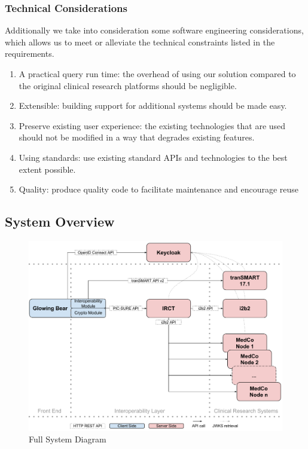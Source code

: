 \begin{samepage}
\subsubsection*{Technical Considerations}

Additionally we take into consideration some software engineering considerations, which allows us to meet or alleviate the technical constraints listed in the requirements.
\begin{enumerate}
    \item A practical query run time: the overhead of using our solution compared to the original clinical research platforms should be negligible.
    \item Extensible: building support for additional systems should be made easy.
    \item Preserve existing user experience: the existing technologies that are used should not be modified in a way that degrades existing features.
    \item Using standards: use existing standard APIs and technologies to the best extent possible.
    \item Quality: produce quality code to facilitate maintenance and encourage reuse
\end{enumerate}
\end{samepage}


\subsection{System Overview}
\begin{figure}[ht]
    \centering
    \includegraphics[width=1\textwidth]{figures/sys_diagram_full.pdf}
    \caption{Full System Diagram}
    \label{fig:sys-diagram-full}
\end{figure}

